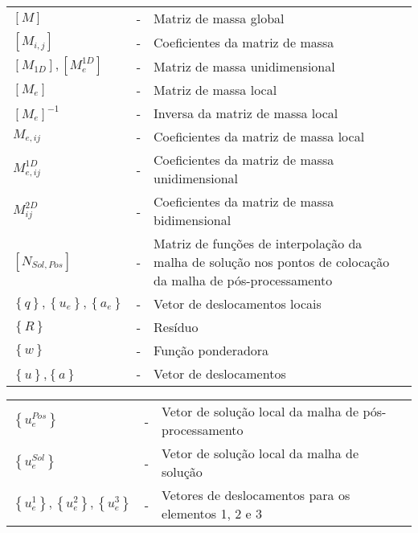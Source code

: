 \begin{tabular}[!thp]{l c p{.72\linewidth} c}
$\left[M \right]$ & - & Matriz de massa global\\
$\left[M_{i,j} \right]$ & - & Coeficientes da matriz de massa\\
$\left[ M_{1D} \right], \left[ M_{e}^{1D} \right]$ & - & Matriz de massa unidimensional\\
$\left[M_{e} \right]$ & - & Matriz de massa local\\
$\left[M_{e} \right]^{-1}$ & - & Inversa da matriz de massa local\\
$M_{e,ij}$ & - & Coeficientes da matriz de massa local\\
$M^{1D}_{e,ij}$ & - & Coeficientes da matriz de massa unidimensional\\
$M^{2D}_{ij}$ & - & Coeficientes da matriz de massa bidimensional\\

$\left[N_{Sol,Pos} \right]$ & - & Matriz de funções de interpolação da malha de solução nos pontos
de colocação da malha de pós-processamento\\

$\left\{q \right\}, \left\{u_{e}\right\}, \left\{a_{e}\right\}$ & - & Vetor de deslocamentos
locais\\

$\left\{R \right\}$ & - & Resíduo\\

$\left\{w \right\}$ & - & Função ponderadora\\

$\left\{u \right\}$,$\left\{a \right\}$ & - & Vetor de deslocamentos\\

\end{tabular}


\clearpage
\setcounter{page}{22}

\noindent
\begin{tabular}[!thp]{l c p{.72\linewidth} c}
$\left\{u^{Pos}_{e} \right\}$ & - & Vetor de solução local da malha de pós-processamento\\
$\left\{u^{Sol}_{e} \right\}$ & - & Vetor de solução local da malha de solução\\
$\left\{ u^{1}_{e} \right\}, \left\{ u^{2}_{e} \right\}, \left\{ u^{3}_{e} \right\}$ & - & Vetores
de deslocamentos para os elementos 1, 2 e 3\\
\end{tabular}
\newline \newline


